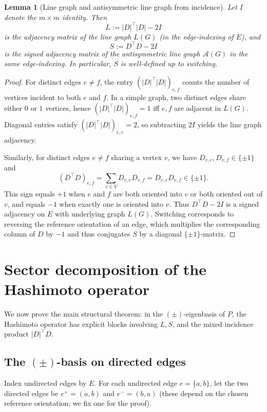 \documentclass[11pt]{article}
\newtheorem{lemma}{Lemma}
\begin{document}
\begin{lemma}[Line graph and antisymmetric line graph from incidence]\label{lem:LSfrominc}
Let $I$ denote the $m\times m$ identity. Then
\[
L := |D|^\top|D| - 2I
\]
is the adjacency matrix of the line graph $L(G)$ (in the edge-indexing of $E$), and
\[
S := D^\top D - 2I
\]
is the signed adjacency matrix of the antisymmetric line graph $\mathcal A(G)$ in the same edge-indexing. In particular, $S$ is well-defined up to switching.
\end{lemma}

\begin{proof}
For distinct edges $e\neq f$, the entry $(|D|^\top|D|)_{e,f}$ counts the number of vertices incident to both $e$ and $f$. In a simple graph, two distinct edges share either $0$ or $1$ vertices, hence $(|D|^\top|D|)_{e,f}=1$ iff $e,f$ are adjacent in $L(G)$. Diagonal entries satisfy $(|D|^\top|D|)_{e,e}=2$, so subtracting $2I$ yields the line graph adjacency.

Similarly, for distinct edges $e\neq f$ sharing a vertex $v$, we have $D_{v,e},D_{v,f}\in\{\pm1\}$ and
\[
(D^\top D)_{e,f}=\sum_{v\in V} D_{v,e}D_{v,f}=D_{v,e}D_{v,f}\in\{\pm1\}.
\]
This sign equals $+1$ when $e$ and $f$ are both oriented into $v$ or both oriented out of $v$, and equals $-1$ when exactly one is oriented into $v$. Thus $D^\top D-2I$ is a signed adjacency on $E$ with underlying graph $L(G)$. Switching corresponds to reversing the reference orientation of an edge, which multiplies the corresponding column of $D$ by $-1$ and thus conjugates $S$ by a diagonal $\{\pm1\}$-matrix.  \end{proof}

\section{Sector decomposition of the Hashimoto operator}

We now prove the main structural theorem: in the $(\pm)$-eigenbasis of $P$, the Hashimoto operator has explicit blocks involving $L,S$, and the mixed incidence product $|D|^\top D$.

\subsection{The $(\pm)$-basis on directed edges}

Index undirected edges by $E$. For each undirected edge $e=\{a,b\}$, let the two directed edges be $e^+=(a,b)$ and $e^-=(b,a)$ (these depend on the chosen reference orientation; we fix one for the proof).
\end{document}
